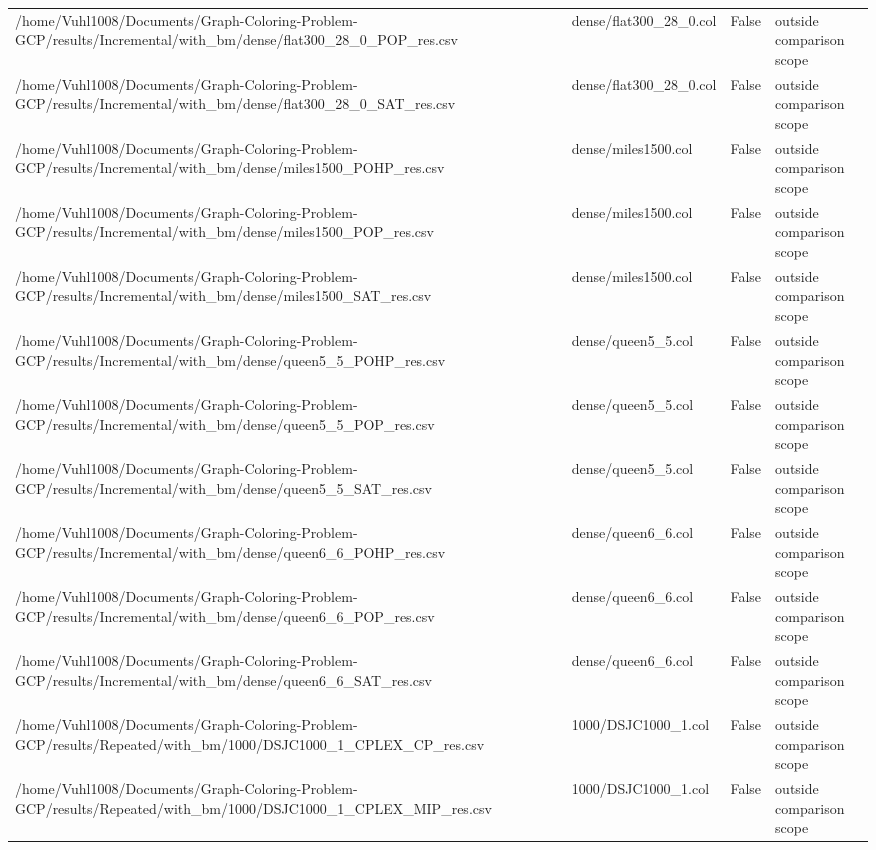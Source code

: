 \begin{table}[htbp]
\begin{tabular}{llll}
/home/Vuhl1008/Documents/Graph-Coloring-Problem-GCP/results/Incremental/with\_bm/dense/flat300\_28\_0\_POP\_res.csv & dense/flat300\_28\_0.col & False & outside comparison scope \\
/home/Vuhl1008/Documents/Graph-Coloring-Problem-GCP/results/Incremental/with\_bm/dense/flat300\_28\_0\_SAT\_res.csv & dense/flat300\_28\_0.col & False & outside comparison scope \\
/home/Vuhl1008/Documents/Graph-Coloring-Problem-GCP/results/Incremental/with\_bm/dense/miles1500\_POHP\_res.csv & dense/miles1500.col & False & outside comparison scope \\
/home/Vuhl1008/Documents/Graph-Coloring-Problem-GCP/results/Incremental/with\_bm/dense/miles1500\_POP\_res.csv & dense/miles1500.col & False & outside comparison scope \\
/home/Vuhl1008/Documents/Graph-Coloring-Problem-GCP/results/Incremental/with\_bm/dense/miles1500\_SAT\_res.csv & dense/miles1500.col & False & outside comparison scope \\
/home/Vuhl1008/Documents/Graph-Coloring-Problem-GCP/results/Incremental/with\_bm/dense/queen5\_5\_POHP\_res.csv & dense/queen5\_5.col & False & outside comparison scope \\
/home/Vuhl1008/Documents/Graph-Coloring-Problem-GCP/results/Incremental/with\_bm/dense/queen5\_5\_POP\_res.csv & dense/queen5\_5.col & False & outside comparison scope \\
/home/Vuhl1008/Documents/Graph-Coloring-Problem-GCP/results/Incremental/with\_bm/dense/queen5\_5\_SAT\_res.csv & dense/queen5\_5.col & False & outside comparison scope \\
/home/Vuhl1008/Documents/Graph-Coloring-Problem-GCP/results/Incremental/with\_bm/dense/queen6\_6\_POHP\_res.csv & dense/queen6\_6.col & False & outside comparison scope \\
/home/Vuhl1008/Documents/Graph-Coloring-Problem-GCP/results/Incremental/with\_bm/dense/queen6\_6\_POP\_res.csv & dense/queen6\_6.col & False & outside comparison scope \\
/home/Vuhl1008/Documents/Graph-Coloring-Problem-GCP/results/Incremental/with\_bm/dense/queen6\_6\_SAT\_res.csv & dense/queen6\_6.col & False & outside comparison scope \\
/home/Vuhl1008/Documents/Graph-Coloring-Problem-GCP/results/Repeated/with\_bm/1000/DSJC1000\_1\_CPLEX\_CP\_res.csv & 1000/DSJC1000\_1.col & False & outside comparison scope \\
/home/Vuhl1008/Documents/Graph-Coloring-Problem-GCP/results/Repeated/with\_bm/1000/DSJC1000\_1\_CPLEX\_MIP\_res.csv & 1000/DSJC1000\_1.col & False & outside comparison scope \\

\end{tabular}
\end{table}
